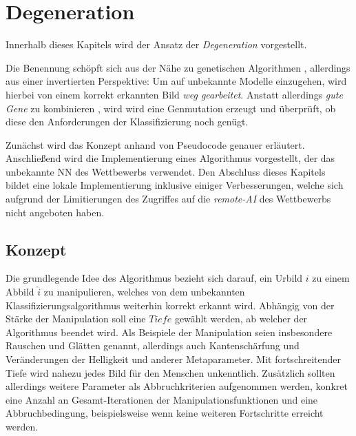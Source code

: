 \chapter{Degeneration}
\label{cha:Degeneration}
Innerhalb dieses Kapitels wird der Ansatz der \textit{Degeneration} vorgestellt.

Die Benennung schöpft sich aus der Nähe zu genetischen Algorithmen \cite{heistermann2013genetische}, allerdings aus einer invertierten Perspektive: 
Um auf unbekannte Modelle einzugehen, wird hierbei von einem korrekt erkannten Bild \textit{weg gearbeitet}. 
Anstatt allerdings \textit{gute Gene} zu kombinieren \cite{schoneburg1994genetische}, wird wird eine Genmutation erzeugt und überprüft, ob diese den Anforderungen der Klassifizierung noch genügt.

Zunächst wird das Konzept anhand von Pseudocode genauer erläutert. 
Anschließend wird die Implementierung eines Algorithmus vorgestellt, der das unbekannte \ac{NN} des Wettbewerbs verwendet.
Den Abschluss dieses Kapitels bildet eine lokale Implementierung inklusive einiger Verbesserungen, welche sich aufgrund der Limitierungen des Zugriffes auf die \textit{remote-AI} des Wettbewerbs nicht angeboten haben.
\section{Konzept}
\label{sec:DegenerationKonzept}
Die grundlegende Idee des Algorithmus bezieht sich darauf, ein Urbild $i$ zu einem Abbild $\hat{i}$ zu manipulieren, welches von dem unbekannten Klassifizierungsalgorithmus weiterhin korrekt erkannt wird. 
Abhängig von der Stärke der Manipulation soll eine $Tiefe$ gewählt werden, ab welcher der Algorithmus beendet wird. 
Als Beispiele der Manipulation seien insbesondere Rauschen und Glätten genannt, allerdings auch Kantenschärfung und Veränderungen der Helligkeit und anderer Metaparameter. 
Mit fortschreitender Tiefe wird nahezu jedes Bild für den Menschen unkenntlich. 
Zusätzlich sollten allerdings weitere Parameter als Abbruchkriterien aufgenommen werden, konkret eine Anzahl an Gesamt-Iterationen der Manipulationsfunktionen und eine Abbruchbedingung, beispielsweise wenn keine weiteren Fortschritte erreicht werden.

\newpage
